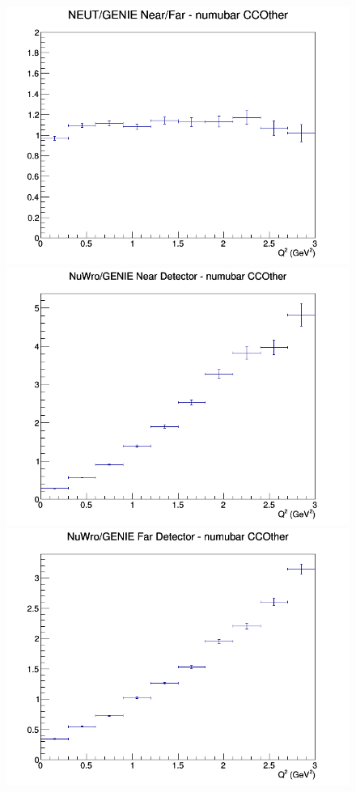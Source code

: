 \documentclass[12pt]{article}
\begin{document}
\begin{figure}[h]
\endminipage
{}
\includegraphics[width=\linewidth]{Q2/nominal/ratios/CCOther_NEUT_GENIE_numubar_NF_Q2.png}
\endminipage
\newline
{}
\includegraphics[width=\linewidth]{Q2/nominal/ratios/CCOther_NuWro_GENIE_numubar_near_Q2.png}
\endminipage
{}
\includegraphics[width=\linewidth]{Q2/nominal/ratios/CCOther_NuWro_GENIE_numubar_far_Q2.png}

\end{figure}
\end{document}
